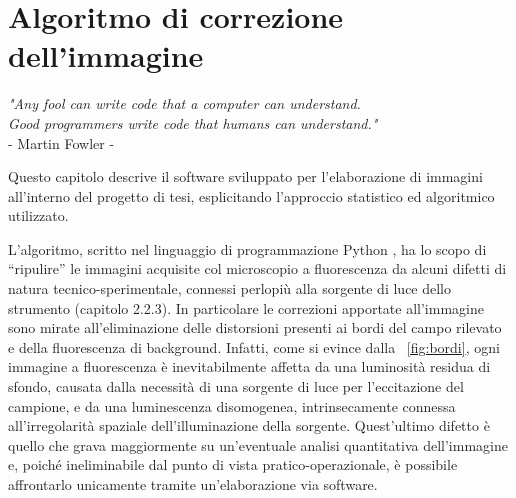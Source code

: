 \clearpage{\pagestyle{empty}\cleardoublepage}

\chapter{Algoritmo di correzione dell'immagine}

\begin{flushright}\begin{small}\textit{"Any fool can write code that a computer can understand.\\
Good programmers write code that humans can understand."}\\
- Martin Fowler -\\
\end{small}\end{flushright}

Questo capitolo descrive il software sviluppato per l'elaborazione di immagini all'interno del progetto di tesi, esplicitando l'approccio statistico ed algoritmico utilizzato.

L'algoritmo, scritto nel linguaggio di programmazione Python \cite{python}, ha lo scopo di ``ripulire'' le immagini acquisite col microscopio a fluorescenza da alcuni difetti di natura tecnico-sperimentale, connessi perlopiù alla sorgente di luce dello strumento (capitolo 2.2.3). 
In particolare le correzioni apportate all'immagine sono mirate all'eliminazione delle distorsioni presenti ai bordi del campo rilevato e della fluorescenza di background. 
Infatti, come si evince dalla \figurename~\ref{fig:bordi}, ogni immagine a fluorescenza è inevitabilmente affetta da una luminosità residua di sfondo, causata dalla necessità di una sorgente di luce per l'eccitazione del campione, e da una luminescenza disomogenea, intrinsecamente connessa all'irregolarità spaziale dell'illuminazione della sorgente.
Quest'ultimo difetto è quello che grava maggiormente su un'eventuale analisi quantitativa dell'immagine e, poiché ineliminabile dal punto di vista pratico-operazionale, è possibile affrontarlo unicamente tramite un'elaborazione via software. 

